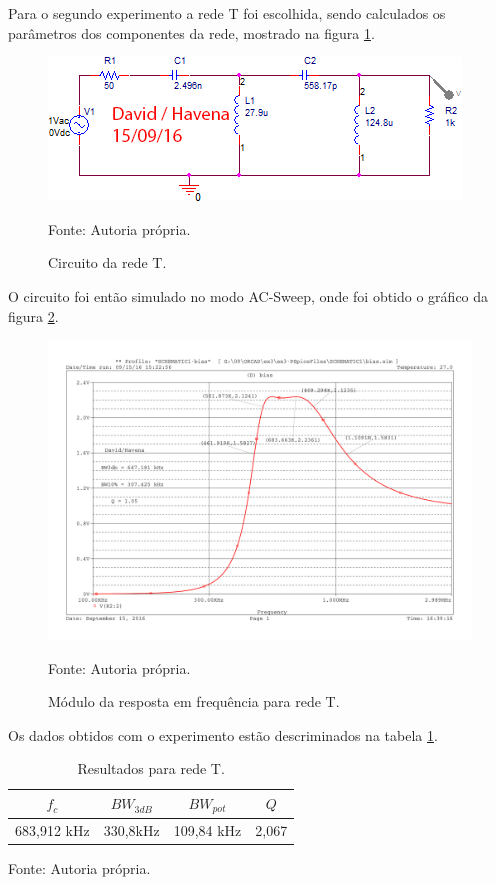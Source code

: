 Para o segundo experimento a rede T foi escolhida, sendo calculados os parâmetros dos componentes da rede, mostrado na figura \ref{f_sch_rede_T}.
 
\begin{figure}[H]
    \centering
    \caption{Circuito da rede T.}
    \includegraphics[scale=0.7]{Imagens/ex3/sch.png}
    \label{f_sch_rede_T}
    
    \small Fonte: Autoria própria.
\end{figure}
    
O circuito foi então simulado no modo AC-Sweep, onde foi obtido o gráfico da figura \ref{f_rede_T_graph}.
    
\begin{figure}[H]
    \centering
    \caption{Módulo da resposta em frequência para rede T.}
    \includegraphics[scale=0.5]{Imagens/ex3/fres.pdf}
    \label{f_rede_T_graph}
    
    \small Fonte: Autoria própria.
\end{figure}
    
Os dados obtidos com o experimento estão descriminados na tabela \ref{tab:rest}.

\begin{table}[H]
    \centering
    \caption{Resultados para rede T.}
    \label{tab:rest}
    \begin{tabular}{cccc}
        \hline
        $f_c$ & $BW_{3dB}$ & $BW_{pot}$ & $Q$ \\
        \hline
        683,912 kHz & 330,8kHz & 109,84 kHz & 2,067 \\
        \hline
    \end{tabular}
    
    \small Fonte: Autoria própria.
\end{table}

